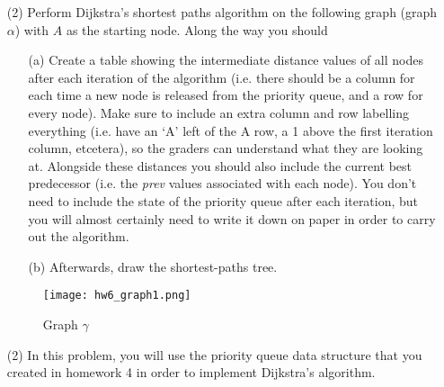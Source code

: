 \documentclass[12pt]{article}
\begin{document}
\begin{enumerate}
\begin{center}
    \end{center}
    \item[(2)] Perform Dijkstra's shortest paths algorithm on the following graph (graph $\alpha$) with $A$ as the starting node. Along the way you should
    \begin{itemize}
        \item[(a)] Create a table showing the intermediate distance values of all nodes after each iteration of the algorithm (i.e. there should be a column for each time a new node is released from the priority queue, and a row for every node). Make sure to include an extra column and row labelling everything (i.e. have an `A' left of the A row, a 1 above the first iteration column, etcetera), so the graders can understand what they are looking at. Alongside these distances you should also include the current best predecessor (i.e. the \emph{prev} values associated with each node). You don't need to include the state of the priority queue after each iteration, but you will almost certainly need to write it down on paper in order to carry out the algorithm.
        \item[(b)] Afterwards, draw the shortest-paths tree. 
    \end{itemize}
    \begin{figure}[h]
        \centering
        \texttt{[image: hw6\_graph1.png]}
        \caption{Graph $\gamma$}
    \end{figure}
    \item[(2)] In this problem, you will use the priority queue data structure that you created in homework 4 in order to implement Dijkstra's algorithm. 

\end{enumerate}
\end{document}
